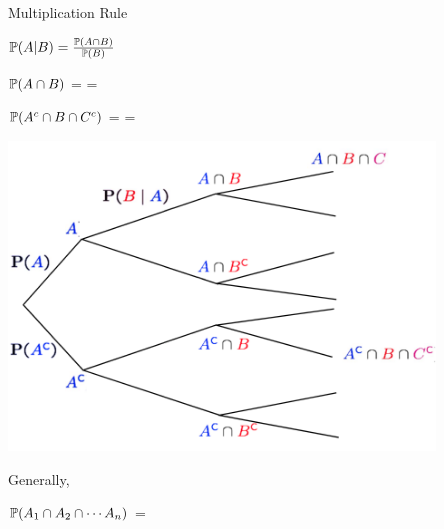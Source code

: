 \documentclass[fleqn,aspectratio=169]{beamer}
\begin{document}
\begin{frame}{Multiplication Rule}

{
\plitemsep 0.1in
\bci 

\item<1-> $\mathbb{P}( A | B ) = \frac{\mathbb{P}( A \cap B )}{\mathbb{P}( B )}$

\item $\mathbb{P}( A \cap B )$ =  = 

\item $\mathbb{P}( A^c \cap B \cap C^c )$ = 
 = 
\bigskip

\eci 
}
{
\centering
\includegraphics[width=0.85\textwidth]{L2_multi_ex.png}
}

Generally, 

$\mathbb{P}( A_1 \cap A_2 \cap \cdots A_n )$ = 

\end{frame}
\end{document}
